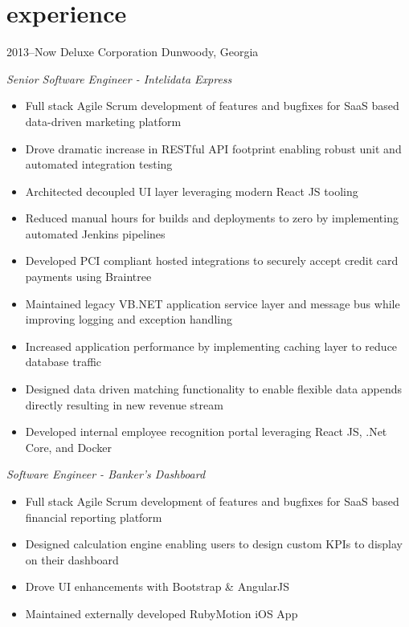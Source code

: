 \documentclass[]{friggeri-cv} %
\begin{document}
\section{experience}
\begin{entrylist}


\entry
{2013--Now}
{Deluxe Corporation}
{Dunwoody, Georgia}
{\raggedright
  \emph{Senior Software Engineer - Intelidata Express}
  \begin{itemize}
    \item Full stack Agile Scrum development of features and bugfixes for SaaS based data-driven marketing platform 
    \item Drove dramatic increase in RESTful API footprint enabling robust unit and automated integration testing
    \item Architected decoupled UI layer leveraging modern React JS tooling
    \item Reduced manual hours for builds and deployments to zero by implementing automated Jenkins pipelines
    \item Developed PCI compliant hosted integrations to securely accept credit card payments using Braintree
    \item Maintained legacy VB.NET application service layer and message bus while improving logging and exception handling
    \item Increased application performance by implementing caching layer to reduce database traffic
    \item Designed data driven matching functionality to enable flexible data appends directly resulting in new revenue stream
    \item Developed internal employee recognition portal leveraging React JS, .Net Core, and Docker
  \end{itemize}
  \emph{Software Engineer - Banker's Dashboard}
  \begin{itemize}
    \item Full stack Agile Scrum development of features and bugfixes for SaaS based financial reporting platform
    \item Designed calculation engine enabling users to design custom KPIs to display on their dashboard
    \item Drove UI enhancements with Bootstrap \& AngularJS
    \item Maintained externally developed RubyMotion iOS App
  \end{itemize}
}
\end{entrylist}
\end{document}

